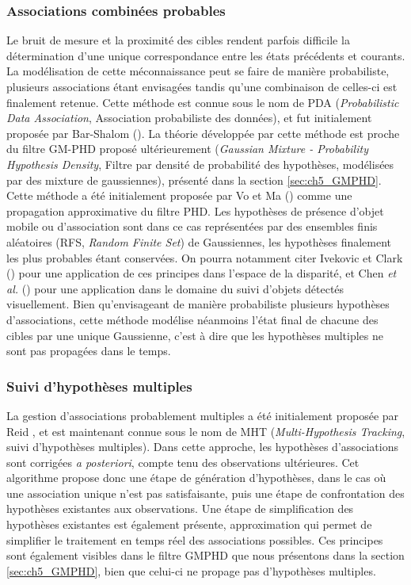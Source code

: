 \subsubsection{Associations combinées probables}
Le bruit de mesure et la proximité des cibles rendent parfois difficile la détermination d'une unique correspondance entre les états précédents et courants. La modélisation de cette méconnaissance peut se faire de manière probabiliste, plusieurs associations étant envisagées tandis qu'une combinaison de celles-ci est finalement retenue. Cette méthode est connue sous le nom de PDA (\emph{Probabilistic Data Association}, Association probabiliste des données), et fut initialement proposée par Bar-Shalom (\cite{Bar-Shalom1975, Bar-shalom}). La théorie développée par cette méthode est proche du filtre GM-PHD proposé ultérieurement (\emph{Gaussian Mixture - Probability Hypothesis Density}, Filtre par densité de probabilité des hypothèses, modélisées par des mixture de gaussiennes), présenté dans la section \ref{sec:ch5_GMPHD}. Cette méthode a été initialement proposée par Vo et Ma (\cite{Vo2006a}) comme une propagation approximative du filtre PHD. Les hypothèses de présence d'objet mobile ou d'association sont dans ce cas représentées par des ensembles finis aléatoires (RFS, \emph{Random Finite Set}) de Gaussiennes, les hypothèses finalement les plus probables étant conservées. On pourra notamment citer Ivekovic et Clark (\cite{Ivekovic2009}) pour une application de ces principes dans l'espace de la disparité, et Chen \textit{et al.} (\cite{Chen2011}) pour une application dans le domaine du suivi d'objets détectés visuellement. Bien qu'envisageant de manière probabiliste plusieurs hypothèses d'associations, cette méthode modélise néanmoins l'état final de chacune des cibles par une unique Gaussienne, c'est à dire que les hypothèses multiples ne sont pas propagées dans le temps.\\

\subsubsection{Suivi d'hypothèses multiples}
La gestion d'associations probablement multiples a été initialement proposée par Reid \cite{Reid1979}, et est maintenant connue sous le nom de MHT (\emph{Multi-Hypothesis Tracking}, suivi d'hypothèses multiples). Dans cette approche, les hypothèses d'associations sont corrigées \textit{a posteriori}, compte tenu des observations ultérieures. Cet algorithme propose donc une étape de génération d'hypothèses, dans le cas où une association unique n'est pas satisfaisante, puis une étape de confrontation des hypothèses existantes aux observations. Une étape de simplification des hypothèses existantes est également présente, approximation qui permet de simplifier le traitement en temps réel des associations possibles. Ces principes sont également visibles dans le filtre GMPHD que nous présentons dans la section \ref{sec:ch5_GMPHD}, bien que celui-ci ne propage pas d'hypothèses multiples.\\

